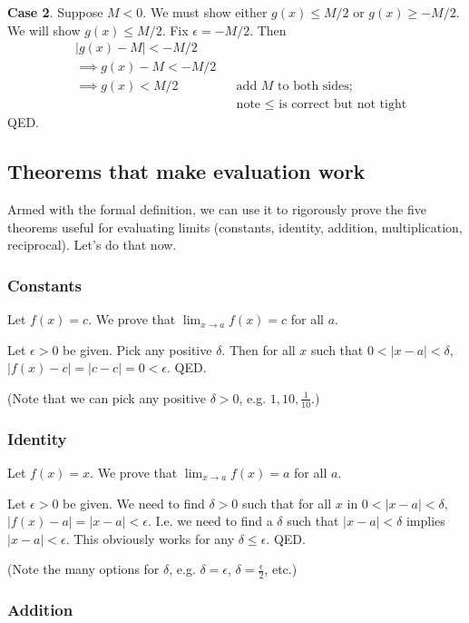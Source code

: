\textbf{Case 2}. Suppose $M<0$. We must show either $g(x)\leq M/2$ or
$g(x)\geq -M/2$. We will show $g(x)\leq M/2$. Fix $\epsilon=-M/2$. Then
\begin{align*}
    &|g(x)-M|<-M/2\\
    &\implies g(x)-M<-M/2\\
    &\implies g(x)<M/2&&\text{add $M$ to both sides;}\\
    & &&\text{note $\leq$ is correct but not tight}
\end{align*}
QED.

\subsection{Theorems that make evaluation work}

Armed with the formal definition, we can use it to rigorously prove
the five theorems useful for evaluating limits (constants, identity,
addition, multiplication, reciprocal). Let's do that now.

\subsubsection*{Constants}
Let $f(x)=c$. We prove that $\lim_{x\to a}f(x)=c$ for all $a$.

\vs

Let $\epsilon>0$ be given. Pick any positive $\delta$. Then for all
$x$ such that $0<|x-a|<\delta$, $|f(x)-c|=|c-c|=0<\epsilon$. QED.

\vs

(Note that we can pick any positive $\delta>0$, e.g.
$1, 10, \frac{1}{10}$.)

\subsubsection*{Identity}

Let $f(x)=x$. We prove that $\lim_{x\to a}f(x)=a$ for all $a$.

\vs

Let $\epsilon>0$ be given. We need to find $\delta>0$ such that for all
$x$ in $0<|x-a|<\delta$, $|f(x)-a|=|x-a|<\epsilon$. I.e. we need to find a
$\delta$ such that $|x-a|<\delta$ implies $|x-a|<\epsilon$. This obviously works for
any $\delta\leq\epsilon$. QED.

\vs

(Note the many options for $\delta$, e.g. $\delta=\epsilon$, $\delta=\frac{\epsilon}{2}$, etc.)

\subsubsection*{Addition}

